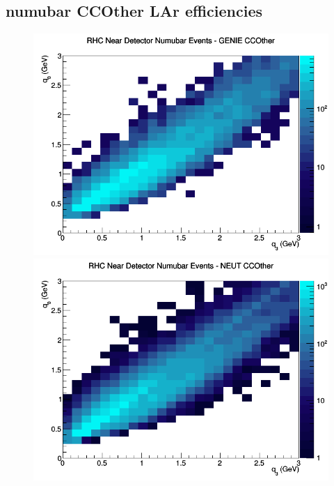 \subsection{numubar CCOther LAr efficiencies}
\begin{figure}[h]
\includegraphics[width=\linewidth]{eff_q0_q3/LAr/CCOther_RHC_ND_numubar_q3_q0_GENIE.png}
\endminipage
{}
\includegraphics[width=\linewidth]{eff_q0_q3/LAr/CCOther_RHC_ND_numubar_q3_q0_NEUT.png}
\endminipage
{}

\end{figure}

